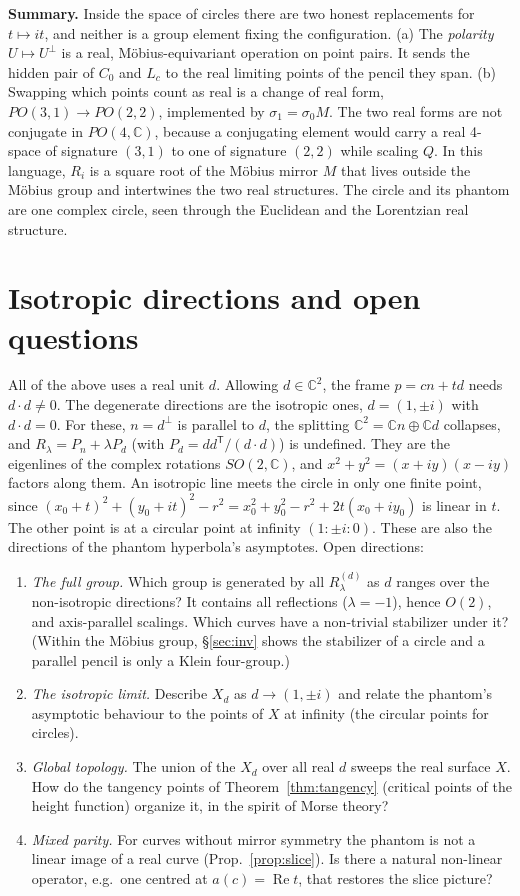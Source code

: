 \documentclass[11pt]{article}
\theoremstyle{definition}\newtheorem{definition}[theorem]{Definition}\newtheorem{remark}[theorem]{Remark}
\newcommand{\C}{\mathbb{C}}\newcommand{\Z}{\mathbb{Z}}\newcommand{\R}{\mathbb{R}}\renewcommand{\Re}{\operatorname{Re}}\renewcommand{\Im}{\operatorname{Im}}
\begin{document}
\noindent\textbf{Summary.} Inside the space of circles there are two honest replacements for $t\mapsto it$, and neither is a group element fixing the configuration.
(a) The \emph{polarity} $U\mapsto U^\perp$ is a real, Möbius-equivariant operation on point pairs. It sends the hidden pair of $C_0$ and $L_c$ to the real limiting points of the pencil they span.
(b) Swapping which points count as real is a change of real form, $PO(3,1)\to PO(2,2)$, implemented by $\sigma_1=\sigma_0M$. The two real forms are not conjugate in $PO(4,\C)$, because a conjugating element would carry a real 4-space of signature $(3,1)$ to one of signature $(2,2)$ while scaling $Q$. In this language, $R_i$ is a square root of the Möbius mirror $M$ that lives outside the Möbius group and intertwines the two real structures. The circle and its phantom are one complex circle, seen through the Euclidean and the Lorentzian real structure.

\section{Isotropic directions and open questions}\label{sec:iso}
All of the above uses a real unit $d$. Allowing $d\in\C^2$, the frame $p=cn+td$ needs $d\cdot d\neq0$. The degenerate directions are the isotropic ones, $d=(1,\pm i)$ with $d\cdot d=0$. For these, $n=d^\perp$ is parallel to $d$, the splitting $\C^2=\C n\oplus\C d$ collapses, and $R_\lambda=P_n+\lambda P_d$ (with $P_d=dd^{\mathsf T}/(d\cdot d)$) is undefined. They are the eigenlines of the complex rotations $SO(2,\C)$, and $x^2+y^2=(x+iy)(x-iy)$ factors along them. An isotropic line meets the circle in only one finite point, since $(x_0+t)^2+(y_0+it)^2-r^2=x_0^2+y_0^2-r^2+2t(x_0+iy_0)$ is linear in $t$. The other point is at a circular point at infinity $(1:\pm i:0)$. These are also the directions of the phantom hyperbola's asymptotes. Open directions:
\begin{enumerate}
\item \emph{The full group.} Which group is generated by all $R^{(d)}_\lambda$ as $d$ ranges over the non-isotropic directions? It contains all reflections ($\lambda=-1$), hence $O(2)$, and axis-parallel scalings. Which curves have a non-trivial stabilizer under it? (Within the Möbius group, \S\ref{sec:inv} shows the stabilizer of a circle and a parallel pencil is only a Klein four-group.)
\item \emph{The isotropic limit.} Describe $X_d$ as $d\to(1,\pm i)$ and relate the phantom's asymptotic behaviour to the points of $X$ at infinity (the circular points for circles).
\item \emph{Global topology.} The union of the $X_d$ over all real $d$ sweeps the real surface $X$. How do the tangency points of Theorem~\ref{thm:tangency} (critical points of the height function) organize it, in the spirit of Morse theory?
\item \emph{Mixed parity.} For curves without mirror symmetry the phantom is not a linear image of a real curve (Prop.~\ref{prop:slice}). Is there a natural non-linear operator, e.g.\ one centred at $a(c)=\Re t$, that restores the slice picture?
\end{enumerate}
\end{document}
